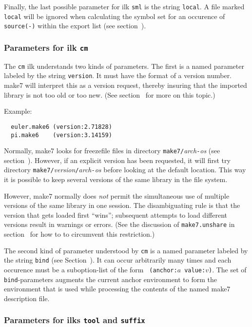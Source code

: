 Finally, the last possible parameter for ilk {\tt sml} is the string
{\tt local}.  A file marked {\tt local} will be ignored when
calculating the symbol set for an occurence of {\tt source(-)} within
the export list (see section~).

\subsubsection{Parameters for ilk {\tt cm}}
\label{sec:toolparam:cm}

The {\tt cm} ilk understands two kinds of parameters.  The first is
a named parameter labeled by the string {\tt version}.  It must have
the format of a version number.  make7 will interpret this as a version
request, thereby insuring that the imported library is not too old or
too new. (See section~ for more on this topic.)

Example:

\begin{verbatim}
  euler.make6 (version:2.71828)
  pi.make6    (version:3.14159)
\end{verbatim}

Normally, make7 looks for freezefile files in directory
{\tt make7/}{\it arch}{\tt -}{\it os} (see section~).
However, if an explicit version has been requested, it will first try
directory {\tt make7/}{\it version}{\tt /}{\it arch}{\tt -}{\it os}
before looking at the default location.  This way it is possible to
keep several versions of the same library in the file system.

However, make7 normally does {\em not} permit the simultaneous use of
multiple versions of the same library in one session.  The
disambiguating rule is that the version that gets loaded first
``wins''; subsequent attempts to load different versions result in
warnings or errors.  (See the discussion of {\tt make7.unshare} in
section~ for how to to circumvent this restriction.)

The second kind of parameter understood by {\tt cm} is a named
parameter labeled by the string {\tt bind} (see
Section~).  It can occur arbitrarily many times
and each occurence must be a suboption-list of the form {\tt
(anchor:$a$ value:$v$)}.  The set of {\tt bind}-parameters augments
the current anchor environment to form the environment that is used
while processing the contents of the named make7 description file.

\subsubsection{Parameters for ilks {\tt tool} and {\tt suffix}}

